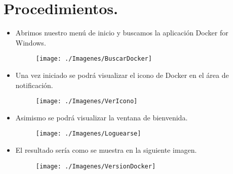 \section{Procedimientos.}

	\begin{itemize}
		\subsection{Parte 1. Iniciando Docker.}
			\item Abrimos nuestro menú de inicio y buscamos la aplicación Docker for Windows.
				\begin{figure}[htb]
					\begin{center}
						\texttt{[image: ./Imagenes/BuscarDocker]}
					\end{center}
				\end{figure}
			\item Una vez iniciado se podrá visualizar el icono de Docker en el área de notificación.
				\begin{figure}[htb]
					\begin{center}
						\texttt{[image: ./Imagenes/VerIcono]}
					\end{center}
				\end{figure}
			\item Asimismo se podrá visualizar la ventana de bienvenida.
				\begin{figure}[htb]
					\begin{center}
						\texttt{[image: ./Imagenes/Loguearse]}
					\end{center}
				\end{figure}
			\item El resultado sería como se muestra en la siguiente imagen.
					\begin{figure}[htb]
						\begin{center}
							\texttt{[image: ./Imagenes/VersionDocker]}
						\end{center}
					\end{figure}
				\vspace{7cm}

\end{itemize}
